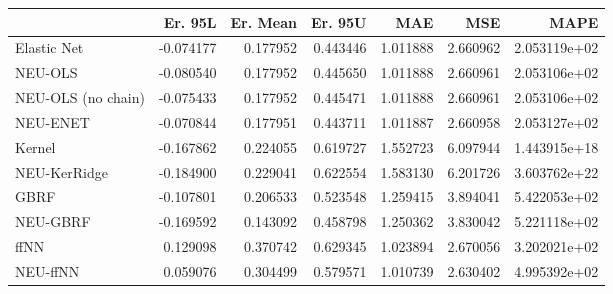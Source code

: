 \begin{tabular}{lrrrrrr}
\toprule
{} &   Er. 95L &  Er. Mean &   Er. 95U &       MAE &       MSE &          MAPE \\
\midrule
Elastic Net        & -0.074177 &  0.177952 &  0.443446 &  1.011888 &  2.660962 &  2.053119e+02 \\
NEU-OLS            & -0.080540 &  0.177952 &  0.445650 &  1.011888 &  2.660961 &  2.053106e+02 \\
NEU-OLS (no chain) & -0.075433 &  0.177952 &  0.445471 &  1.011888 &  2.660961 &  2.053106e+02 \\
NEU-ENET           & -0.070844 &  0.177951 &  0.443711 &  1.011887 &  2.660958 &  2.053127e+02 \\
Kernel             & -0.167862 &  0.224055 &  0.619727 &  1.552723 &  6.097944 &  1.443915e+18 \\
NEU-KerRidge       & -0.184900 &  0.229041 &  0.622554 &  1.583130 &  6.201726 &  3.603762e+22 \\
GBRF               & -0.107801 &  0.206533 &  0.523548 &  1.259415 &  3.894041 &  5.422053e+02 \\
NEU-GBRF           & -0.169592 &  0.143092 &  0.458798 &  1.250362 &  3.830042 &  5.221118e+02 \\
ffNN               &  0.129098 &  0.370742 &  0.629345 &  1.023894 &  2.670056 &  3.202021e+02 \\
NEU-ffNN           &  0.059076 &  0.304499 &  0.579571 &  1.010739 &  2.630402 &  4.995392e+02 \\
\bottomrule
\end{tabular}
